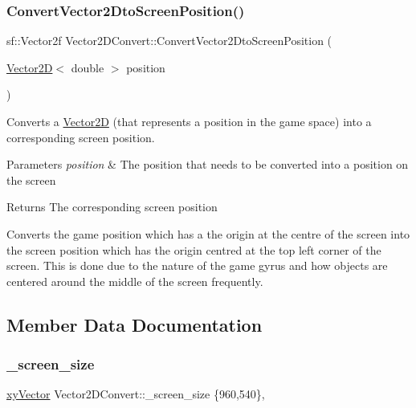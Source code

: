 \subsubsection{\texorpdfstring{Convert\+Vector2\+Dto\+Screen\+Position()}{ConvertVector2DtoScreenPosition()}}
{\footnotesize\ttfamily sf\+::\+Vector2f Vector2\+D\+Convert\+::\+Convert\+Vector2\+Dto\+Screen\+Position (\begin{DoxyParamCaption}\item[{\hyperlink{class_vector2_d}{Vector2D}$<$ double $>$}]{position }\end{DoxyParamCaption})\hspace{0.3cm}{\ttfamily [static]}}



Converts a \hyperlink{class_vector2_d}{Vector2D} (that represents a position in the game space) into a corresponding screen position. 


\begin{DoxyParams}{Parameters}
{\em position} & The position that needs to be converted into a position on the screen \\
\hline
\end{DoxyParams}
\begin{DoxyReturn}{Returns}
The corresponding screen position
\end{DoxyReturn}
Converts the game position which has a the origin at the centre of the screen into the screen position which has the origin centred at the top left corner of the screen. This is done due to the nature of the game gyrus and how objects are centered around the middle of the screen frequently. 

\subsection{Member Data Documentation}
\mbox{\label{class_vector2_d_convert_a6eef0a8081bf94301b98332ef362be2c}} 
\subsubsection{\texorpdfstring{\+\_\+screen\+\_\+size}{\_screen\_size}}
{\footnotesize\ttfamily \hyperlink{structxy_vector}{xy\+Vector} Vector2\+D\+Convert\+::\+\_\+screen\+\_\+size \{960,540\}\hspace{0.3cm}{\ttfamily [static]}, {\ttfamily [private]}}

